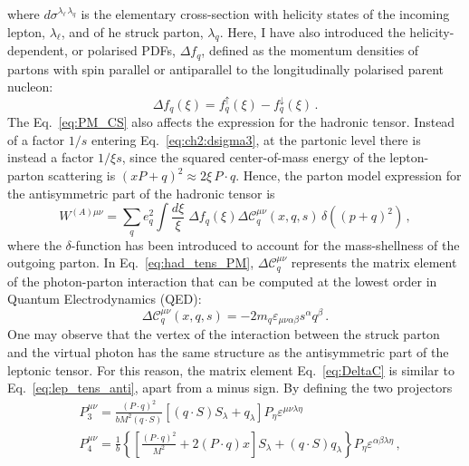where $d \sigma^{\lambda_{\ell} \, \lambda_{q}}$ is the elementary cross-section with helicity states of the incoming lepton, $\lambda_{\ell}$, and of he struck parton, $\lambda_{q}$. Here, I have also introduced the helicity-dependent, or polarised PDFs, $\Delta f_{q}$, defined as the momentum densities of partons with spin parallel or antiparallel to the longitudinally polarised parent nucleon:
\begin{equation}
  \Delta f_{q} (\xi) = f_{q}^{\uparrow}(\xi) - f_{q}^{\downarrow}(\xi) \,.
\end{equation}
The Eq.~\eqref{eq:PM_CS} also affects the expression for the hadronic tensor. Instead of a factor $1/s$ entering Eq.~\eqref{eq:ch2:dsigma3}, at the partonic level there is instead a factor $1/\xi s$, since the squared center-of-mass energy of the lepton-parton scattering is $(xP + q)^2 \approx 2 \xi \, P \cdot q$. Hence, the parton model expression for the antisymmetric part of the hadronic tensor is
\begin{equation}
  W^{(A) \mu \nu}= \sum_{q} e_q^2\int \frac{d \xi}{\xi} \; \Delta f_{q} (\xi) \Delta \mathcal{C}^{\mu \nu}_{q} (x,q,s) \, \delta((p + q)^2) \,,
  \label{eq:had_tens_PM}
\end{equation}
where the $\delta$-function has been introduced to account for the mass-shellness of the outgoing parton. 
In Eq.~\eqref{eq:had_tens_PM}, $\Delta \mathcal{C}^{\mu \nu}_{q}$ represents the matrix element of the photon-parton interaction that can be computed at the lowest order in Quantum Electrodynamics (QED):
\begin{equation}
  \Delta \mathcal{C}_q^{\mu \nu} (x,q,s) = - 2 m_q \varepsilon_{\mu \nu \alpha \beta} s^{\alpha} q^{\beta}\,.
  \label{eq:DeltaC}
\end{equation}
One may observe that the vertex of the interaction between the struck parton and the virtual photon has the same structure as the antisymmetric part of the leptonic tensor. For this reason, the matrix element Eq.~\eqref{eq:DeltaC} is similar to Eq.~\eqref{eq:lep_tens_anti}, apart from a minus sign. By defining the two projectors
\begin{align}
  & P_3^{\mu \nu} = \frac{(P \cdot q)^2}{b M^2 (q \cdot S)} \left[ (q \cdot S) S_{\lambda} + q_{\lambda}  \right] P_{\eta} \varepsilon^{\mu \nu \lambda \eta} 
  \\
  & P_4^{\mu \nu} = \frac{1}{b} \left\{ \left[ \frac{(P\cdot q)^2}{M^2} + 2 (P \cdot q) x \right]S_{\lambda} + (q \cdot S)q_{\lambda} \right\} P_{\eta} \varepsilon^{\alpha \beta \lambda \eta}\,,
\end{align}
